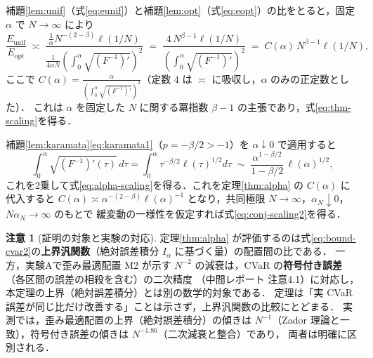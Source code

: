 \documentclass[a4paper,10pt]{jsarticle}
\makeatletter
\theoremstyle{definition}
\newtheorem{remark}{注意}[section]
\renewenvironment{proof}[1][\proofname]{\par
  \pushQED{\qed}%
  \normalfont \topsep6\p@\@plus6\p@\relax
  \trivlist
  \item[\hskip\labelsep\textbf{#1}]\ignorespaces
}{%
  \popQED\endtrivlist\@endpefalse
}
\renewcommand{\proofname}{証明}
\newcommand{\Finv}{F^{-1}}
\makeatother
\begin{document}
\begin{proof}[定理\ref{thm:alpha} の証明]
補題\ref{lem:unif}（式\eqref{eq:eunif}）と補題\ref{lem:opt}（式\eqref{eq:eopt}）の比をとると，固定 $\alpha$ で $N\to\infty$ により
\begin{equation*}
  \frac{E_{\mathrm{unif}}}{E_{\mathrm{opt}}}
  \;\asymp\;\frac{\frac1\alpha N^{-(2-\beta)}\ell(1/N)}{\frac1{4\alpha N}\left(\int_0^\alpha\sqrt{(\Finv)'}\right)^{2}}
  \;=\;\frac{4\,N^{\beta-1}\ell(1/N)}{\left(\int_0^\alpha\sqrt{(\Finv)'}\right)^{2}}
  \;=\;C(\alpha)\,N^{\beta-1}\ell(1/N),
\end{equation*}
ここで $C(\alpha)=\frac{\alpha}{(\int_0^\alpha\sqrt{(\Finv)'})^2}$（定数 $4$ は $\asymp$ に吸収し，$\alpha$ のみの正定数とした）．
これは $\alpha$ を固定した $N$ に関する冪指数 $\beta-1$ の主張であり，式\eqref{eq:thm-scaling}を得る．
\end{proof}

\begin{proof}[命題\ref{prop:alpha} の証明]
補題\ref{lem:karamata}\eqref{eq:karamata1}（$p=-\beta/2>-1$）を $\alpha\downarrow0$ で適用すると
\begin{equation*}
\int_0^\alpha\sqrt{(\Finv)'(\tau)}\,d\tau
=\int_0^\alpha\tau^{-\beta/2}\ell(\tau)^{1/2}d\tau
\;\sim\;\frac{\alpha^{1-\beta/2}}{1-\beta/2}\,\ell(\alpha)^{1/2},
\end{equation*}
これを2乗して式\eqref{eq:alpha-scaling}を得る．これを定理\ref{thm:alpha} の $C(\alpha)$ に代入すると
$C(\alpha)\asymp\alpha^{-(2-\beta)}\ell(\alpha)^{-1}$ となり，共同極限 $N\to\infty$，$\alpha_N\downarrow0$，$N\alpha_N\to\infty$ のもとで
緩変動の一様性を仮定すれば式\eqref{eq:conj-scaling2}を得る．
\end{proof}

\begin{remark}[証明の対象と実験の対応]
\label{rem:scope}
定理\ref{thm:alpha} が評価するのは式\eqref{eq:bound-cvar2}の\textbf{上界汎関数}（絶対誤差積分 $I_\alpha$ に基づく量）の配置間の比である．
一方，実験Aで歪み最適配置 M2 が示す $N^{-2}$ の減衰は，CVaR の\textbf{符号付き誤差}（各区間の誤差の相殺を含む）の二次精度
（中間レポート 注意4.1）に対応し，本定理の上界（絶対誤差積分）とは別の数学的対象である．
定理は「実 CVaR 誤差が同じ比だけ改善する」ことは示さず，上界汎関数の比較にとどまる．
実測では，歪み最適配置の上界（絶対誤差積分）の傾きは $N^{-1}$（Zador 理論と一致），符号付き誤差の傾きは $N^{-1.86}$（二次減衰と整合）であり，
両者は明確に区別される．
\end{remark}
\end{document}
